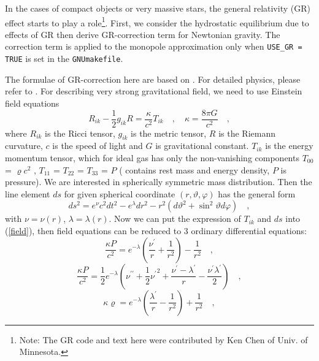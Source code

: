 In the cases of compact objects or very massive stars, the general
relativity (GR) effect starts to play a role\footnote{Note: The GR
  code and text here were contributed by Ken Chen of Univ. of
  Minnesota.}.  First, we consider the hydrostatic equilibrium due to
effects of GR then derive GR-correction term for Newtonian gravity.
The correction term is applied to the monopole approximation only when
{\tt USE\_GR = TRUE} is set in the {\tt GNUmakefile}.

The formulae of GR-correction here are based on \cite{grbk1}. For
detailed physics, please refer to \cite{grbk2}. For describing very
strong gravitational field, we need to use Einstein field equations
\begin{equation}\label{field}
R_{ik}-\frac{1}{2}g_{ik}R=\frac{\kappa}{c^{2}}T_{ik} \quad , \quad
\kappa=\frac{8\pi G}{c^{2}}\quad ,
\end{equation}
where $R_{ik}$ is the Ricci tensor, $g_{ik}$ is the metric tensor, $R$
is the Riemann curvature, $c$ is the speed of light and $G$ is
gravitational constant. $T_{ik}$ is the energy momentum tensor, which
for ideal gas has only the non-vanishing components $T_{00}$ =
$\varrho c^2$ , $T_{11}$ = $T_{22}$ = $T_{33}$ = $P$ ( contains rest
mass and energy density, $P$ is pressure). We are interested in
spherically symmetric mass distribution. Then the line element $ds$
for given spherical coordinate $(r, \vartheta, \varphi)$ has the
general form
\begin{equation}\label{metric}
  ds^{2} = e^{\nu}c^{2}dt^{2}-e^{\lambda}dr^{2}-r^{2}(d\vartheta^{2}+\sin^{2}
  \vartheta d\varphi) \quad ,
\end{equation}
with $\nu = \nu(r)$, $\lambda = \lambda(r)$. Now we can put the
expression of $T_{ik}$ and $ds$ into (\ref{field}), then field
equations can be reduced to 3 ordinary differential equations:
\begin{equation}\label{diff1}
   \frac{\kappa P}{c^{2}} =
   e^{-\lambda}\left (\frac{\nu^{\prime}}{r}+\frac{1}{r^{2}} \right )-\frac{1}{r^{2}}
   \quad ,
\end{equation}
\begin{equation}\label{diff2}
  \frac{\kappa P}{c^{2}} =
  \frac{1}{2}e^{-\lambda}\left (\nu^{\prime\prime}+\frac{1}{2}{\nu^{\prime}}^{2}+\frac{\nu^
    {\prime}-\lambda^{\prime}}{r}
   -\frac{\nu^{\prime}\lambda^{\prime}}{2} \right ) \quad ,
\end{equation}
\begin{equation}\label{diff3}
  \kappa \varrho =
  e^{-\lambda}\left (\frac{\lambda^{\prime}}{r}-\frac{1}{r^{2}}\right )+\frac{1}{r^{2}} \quad ,
\end{equation}
